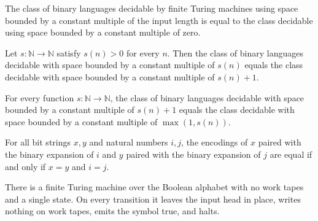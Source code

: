 \begin{theorem}
\label{Complexity.SPACE_id_eq_SPACE_zero}
\leanok
{}
The class of binary languages decidable by finite Turing machines using space bounded by
a constant multiple of the input length is equal to the class decidable using space
bounded by a constant multiple of zero.
\end{theorem}

\begin{theorem}
\label{Complexity.SPACE_succ_of_pos}
\leanok
{}
Let $s : \mathbb{N} \to \mathbb{N}$ satisfy $s(n)>0$ for every $n$. Then the class of
binary languages decidable with space bounded by a constant multiple of $s(n)$ equals
the class decidable with space bounded by a constant multiple of $s(n)+1$.
\end{theorem}

\begin{theorem}
\label{Complexity.SPACE_succ_eq_max_one}
\leanok
{}
For every function $s : \mathbb{N} \to \mathbb{N}$, the class of binary languages
decidable with space bounded by a constant multiple of $s(n)+1$ equals the class
decidable with space bounded by a constant multiple of $\max(1,s(n))$.
\end{theorem}

\begin{theorem}
\label{Turing.pairEncode_bits_inj}
\leanok
{}
For all bit strings $x,y$ and natural numbers $i,j$, the encodings of $x$ paired with
the binary expansion of $i$ and $y$ paired with the binary expansion of $j$ are equal if
and only if $x=y$ and $i=j$.
\end{theorem}

\begin{definition}
\label{Complexity.constTrueTM}
\leanok
{}
There is a finite Turing machine over the Boolean alphabet with no work tapes and a
single state. On every transition it leaves the input head in place, writes nothing on
work tapes, emits the symbol true, and halts.
\end{definition}


